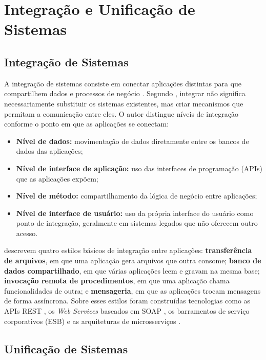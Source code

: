 \section{Integração e Unificação de Sistemas}
\label{sec:integracao}

\subsection{Integração de Sistemas}

A integração de sistemas consiste em conectar aplicações distintas para que compartilhem dados e processos de negócio \citep{hohpe2003}. Segundo \citet{linthicum2000}, integrar não significa necessariamente substituir os sistemas existentes, mas criar mecanismos que permitam a comunicação entre eles. O autor distingue níveis de integração conforme o ponto em que as aplicações se conectam:

\begin{itemize}
    \item \textbf{Nível de dados:} movimentação de dados diretamente entre os bancos de dados das aplicações;
    \item \textbf{Nível de interface de aplicação:} uso das interfaces de programação (APIs) que as aplicações expõem;
    \item \textbf{Nível de método:} compartilhamento da lógica de negócio entre aplicações;
    \item \textbf{Nível de interface de usuário:} uso da própria interface do usuário como ponto de integração, geralmente em sistemas legados que não oferecem outro acesso.
\end{itemize}

\citet{hohpe2003} descrevem quatro estilos básicos de integração entre aplicações: \textbf{transferência de arquivos}, em que uma aplicação gera arquivos que outra consome; \textbf{banco de dados compartilhado}, em que várias aplicações leem e gravam na mesma base; \textbf{invocação remota de procedimentos}, em que uma aplicação chama funcionalidades de outra; e \textbf{mensageria}, em que as aplicações trocam mensagens de forma assíncrona. Sobre esses estilos foram construídas tecnologias como as APIs REST \citep{fielding2000}, os \textit{Web Services} baseados em SOAP \citep{alonso2004}, os barramentos de serviço corporativos (ESB) \citep{chappell2004} e as arquiteturas de microsserviços \citep{newman2015}.

\subsection{Unificação de Sistemas}

